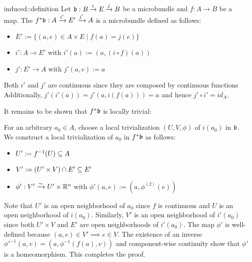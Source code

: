 \begin{mydefinition}{induced::definition}
    Let $\bb: \bundle{B}{E}{i}{j}$ be a microbundle and $f: A \to B$ be a map.
    The  $\bundledef{f^*\bb}{A}{E'}{i'}{j'}$ is a microbundle defined as follows:
    \begin{itemize}
        \item $E' := \{ (a, e) \in A \times E \mid f(a) = j(e) \}$
        \item $i': A \to E'$ with $i'(a) := (a, (i \circ f)(a))$
        \item $j': E' \to A$ with $j'(a, e) := a$
    \end{itemize}
\end{mydefinition}
\begin{myproof}
    Both $i'$ and $j'$ are continuous since they are composed by continuous functions
    Additionally, $j'(i'(a)) = j'(a, i(f(a))) = a$ and hence $j' \circ i' = id_A$.

    It remains to be shown that $f^*\bb$ is locally trivial:

    For an arbitrary $a_0 \in A$, choose a local trivialization $(U, V, \phi)$ of $i(a_0)$ in $\bb$.
    We construct a local trivialization of $a_0$ in $f^*\bb$ as follows:
    \begin{itemize}
        \item $U' := f^{-1}(U) \sub A$
        \item $V' := (U' \times V) \cap E' \sub E'$
        \item $\phi': V' \isomto U' \times \R^n$ with $\phi'(a, e) := (a, \phi^{(2)}(e))$
    \end{itemize}
    Note that $U'$ is an open neighborhood of $a_0$ since $f$ is continuous and $U$ is an open neighborhood of $i(a_0)$.
    Similarly, $V'$ is an open neighborhood of $i'(a_0)$ since both $U' \times V$ and $E'$ are open neighborhoods of $i'(a_0)$.
    The map $\phi'$ is well-defined because $(a, e) \in V' \implies e \in V$.
    The existence of an inverse $\phi'^{-1}(a, v) = (a, \phi^{-1}(f(a), v))$ and component-wise continuity show that $\phi'$ is a homeomorphism.
    This completes the proof. 
\end{myproof}
